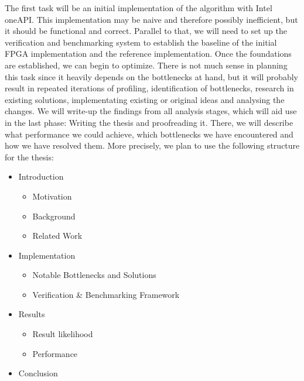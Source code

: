 The first task will be an initial implementation of the algorithm with Intel oneAPI. This implementation may be naive and therefore possibly inefficient, but it should be functional and correct. Parallel to that, we will need to set up the verification and benchmarking system to establish the baseline of the initial FPGA implementation and the reference implementation. Once the foundations are established, we can begin to optimize. There is not much sense in planning this task since it heavily depends on the bottlenecks at hand, but it will probably result in repeated iterations of profiling, identification of bottlenecks, research in existing solutions, implementating existing or original ideas and analysing the changes. We will write-up the findings from all analysis stages, which will aid use in the last phase: Writing the thesis and proofreading it. There, we will describe what performance we could achieve, which bottlenecks we have encountered and how we have resolved them. More precisely, we plan to use the following structure for the thesis:

\begin{itemize}
    \item Introduction
    \begin{itemize}
        \item Motivation
        \item Background
        \item Related Work
    \end{itemize}
    \item Implementation
    \begin{itemize}
        \item Notable Bottlenecks and Solutions
        \item Verification \& Benchmarking Framework
    \end{itemize}
    \item Results
    \begin{itemize}
        \item Result likelihood
        \item Performance
    \end{itemize}
    \item Conclusion
\end{itemize}

